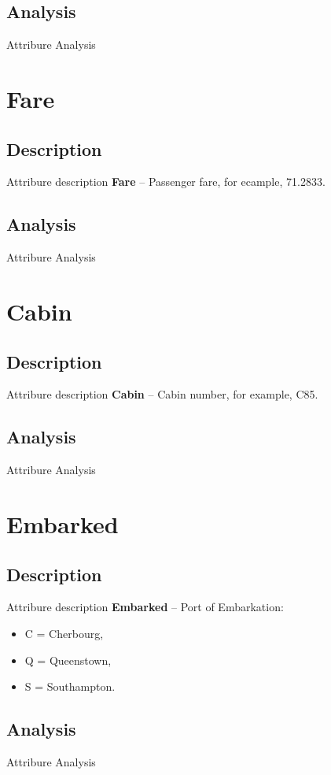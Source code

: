 \subsection{Analysis}
Attribure Analysis


\section{Fare} \label{section:Fare}
\subsection{Description}
Attribure description
\textbf{Fare} -- Passenger fare, for ecample, 71.2833.

\subsection{Analysis}
Attribure Analysis


\section{Cabin} \label{section:Cabin}
\subsection{Description}
Attribure description
\textbf{Cabin} -- Cabin number, for example, C85.

\subsection{Analysis}
Attribure Analysis


\section{Embarked} \label{section:Embarked}
\subsection{Description}
Attribure description
\textbf{Embarked} -- Port of Embarkation:
\begin{itemize}
    \item C = Cherbourg,
    \item Q = Queenstown,
    \item S = Southampton.
\end{itemize}

\subsection{Analysis}
Attribure Analysis